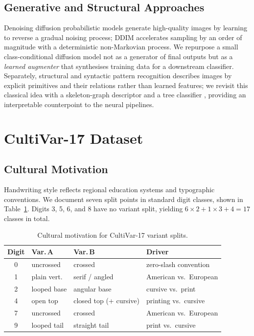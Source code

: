 \documentclass[final,5p,times,twocolumn]{elsarticle}
\begin{document}
\subsection{Generative and Structural Approaches}

Denoising diffusion probabilistic models \cite{Ho2020} generate high-quality images by
learning to reverse a gradual noising process; DDIM \cite{Song2021} accelerates sampling
by an order of magnitude with a deterministic non-Markovian process.
We repurpose a small class-conditional diffusion model not as a generator of final outputs
but as a \emph{learned augmenter} that synthesises training data for a downstream
classifier.
Separately, structural and syntactic pattern recognition \cite{Fu1982} describes images by
explicit primitives and their relations rather than learned features;
we revisit this classical idea with a skeleton-graph descriptor and a tree classifier
\cite{Breiman2001}, providing an interpretable counterpoint to the neural pipelines.

\section{CultiVar-17 Dataset}

\subsection{Cultural Motivation}

Handwriting style reflects regional education systems and typographic conventions.
We document seven split points in standard digit classes, shown in
Table~\ref{tab:variants}.
Digits 3, 5, 6, and 8 have no variant split, yielding $6 \times 2 + 1 \times 3 + 4 = 17$
classes in total.

\begin{table}[t]
  \caption{Cultural motivation for CultiVar-17 variant splits.}
  \label{tab:variants}
  \centering
  \begin{tabular}{@{}clll@{}}
    \toprule
    Digit & Var.\,A & Var.\,B & Driver \\
    \midrule
    0 & uncrossed   & crossed         & zero-slash convention \\
    1 & plain vert. & serif / angled  & American vs.\ European \\
    2 & looped base & angular base    & cursive vs.\ print \\
    4 & open top    & closed top (+ cursive) & printing vs.\ cursive \\
    7 & uncrossed   & crossed         & American vs.\ European \\
    9 & looped tail & straight tail   & print vs.\ cursive \\
    \bottomrule
  \end{tabular}
\end{table}
\end{document}
